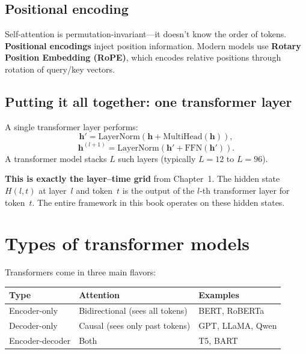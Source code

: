 \documentclass[11pt, twoside, openright]{memoir}
\begin{document}
\subsection{Positional encoding}

Self-attention is permutation-invariant---it doesn't know the order of
tokens.  \textbf{Positional encodings} inject position information.
Modern models use \textbf{Rotary Position Embedding (RoPE)}, which encodes
relative positions through rotation of query/key vectors.

\subsection{Putting it all together: one transformer layer}

A single transformer layer performs:
\[
  \mathbf{h}' = \text{LayerNorm}(\mathbf{h} + \text{MultiHead}(\mathbf{h})),
\]
\[
  \mathbf{h}^{(l+1)} = \text{LayerNorm}(\mathbf{h}' + \text{FFN}(\mathbf{h}')).
\]
A transformer model stacks $L$ such layers (typically $L = 12$ to $L = 96$).

\begin{keyidea}
\textbf{This is exactly the layer--time grid} from Chapter~1.  The hidden
state $H(l,t)$ at layer~$l$ and token~$t$ is the output of the $l$-th
transformer layer for token~$t$.  The entire framework in this book operates
on these hidden states.
\end{keyidea}

\section{Types of transformer models}

Transformers come in three main flavors:

\begin{center}\small
\begin{tabular}{@{}lll@{}}
\toprule
\textbf{Type} & \textbf{Attention} & \textbf{Examples} \\
\midrule
Encoder-only & Bidirectional (sees all tokens) & BERT, RoBERTa \\
Decoder-only & Causal (sees only past tokens) & GPT, LLaMA, Qwen \\
Encoder-decoder & Both & T5, BART \\
\bottomrule
\end{tabular}
\end{center}
\end{document}
